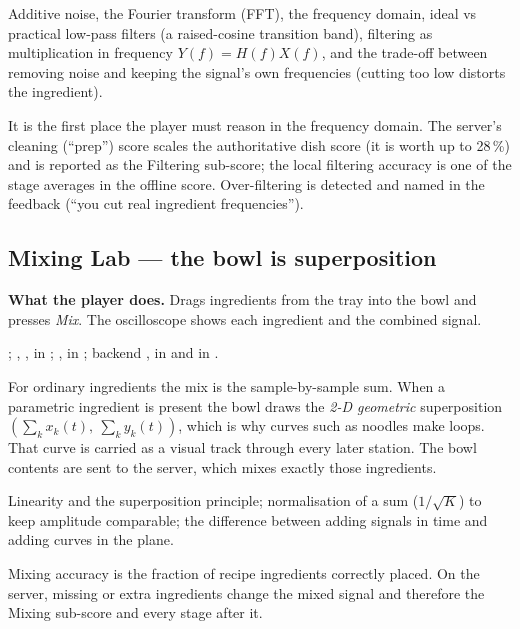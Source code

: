 \documentclass[11pt,a4paper]{article}
\begin{document}
\begin{conceptbox}
Additive noise, the Fourier transform (FFT), the frequency domain, ideal vs
practical low-pass filters (a raised-cosine transition band), filtering as
multiplication in frequency $Y(f)=H(f)X(f)$, and the trade-off between removing
noise and keeping the signal's own frequencies (cutting too low distorts the
ingredient).
\end{conceptbox}
\begin{impactbox}
It is the first place the player must reason in the frequency domain. The server's
cleaning (``prep'') score scales the authoritative dish score (it is worth up to 28\,\%) and is reported
as the Filtering sub-score; the local filtering accuracy is one of the stage
averages in the offline score. Over-filtering is detected and named in the feedback
(``you cut real ingredient frequencies'').
\end{impactbox}

\subsection{Mixing Lab --- the bowl is superposition}
\textbf{What the player does.} Drags ingredients from the tray into the bowl and
presses \emph{Mix}. The oscilloscope shows each ingredient and the combined signal.

\begin{filesbox}
; ,
,  in ;
,  in
; backend ,  in
 and  in .
\end{filesbox}

For ordinary ingredients the mix is the sample-by-sample sum. When a parametric
ingredient is present the bowl draws the \emph{2-D geometric} superposition
$(\sum_k x_k(t),\ \sum_k y_k(t))$, which is why curves such as noodles make loops.
That curve is carried as a visual track through every later station. The bowl
contents are sent to the server, which mixes exactly those ingredients.

\begin{conceptbox}
Linearity and the superposition principle; normalisation of a sum
($1/\sqrt{K}$) to keep amplitude comparable; the difference between adding signals
in time and adding curves in the plane.
\end{conceptbox}
\begin{impactbox}
Mixing accuracy is the fraction of recipe ingredients correctly placed. On the
server, missing or extra ingredients change the mixed signal and therefore the
Mixing sub-score and every stage after it.
\end{impactbox}
\end{document}
